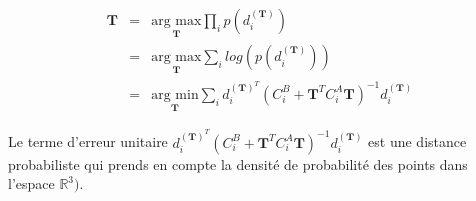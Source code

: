 \begin{eqnarray}
\mathbf{T} &=& \underset{\mathbf{T}}{\text{arg max}} \prod_{i} p(d_{i}^{(\mathbf{T})}) \\
&=& \underset{\mathbf{T}}{\text{arg max}} \sum_{i} log(p(d_{i}^{(\mathbf{T})})) \\
&=& \underset{\mathbf{T}}{\text{arg min}} \sum_{i} d_{i}^{(\mathbf{T})^T}(C_{i}^B + \mathbf{T}^{T}C_{i}^{A}\mathbf{T})^{-1}d_{i}^{(\mathbf{T})}
\end{eqnarray}

Le terme d'erreur unitaire $d_{i}^{(\mathbf{T})^T}(C_{i}^B+\mathbf{T}^{T}C_{i}^{A}\mathbf{T})^{-1}d_{i}^{(\mathbf{T})}$  est une distance probabiliste qui prends en compte la densité de probabilité des points dans l'espace $\mathbb{R}^{3})$. 
